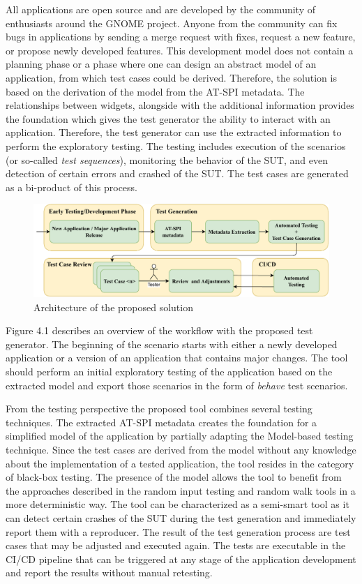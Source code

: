 All applications are open source and are developed by the community of enthusiasts around the GNOME project. Anyone from the community can fix bugs in applications by sending a merge request with fixes, request a new feature, or propose newly developed features. This development model does not contain a planning phase or a phase where one can design an abstract model of an application, from which test cases could be derived. Therefore, the solution is based on the derivation of the model from the AT-SPI metadata. The relationships between widgets, alongside with the additional information provides the foundation which gives the test generator the ability to interact with an application. Therefore, the test generator can use the extracted information to perform the exploratory testing. The testing includes execution of the scenarios (or so-called \textit{test sequences}), monitoring the behavior of the SUT, and even detection of certain errors and crashed of the SUT. The test cases are generated as a bi-product of this process.

\begin{figure}[hbt]
	\centering
	\includegraphics[width=1\textwidth]{obrazky-figures/overview.pdf}
	\caption{Architecture of the proposed solution}
	\label{Diagram}
\end{figure}

Figure 4.1 describes an overview of the workflow with the proposed test generator. The beginning of the scenario starts with either a newly developed application or a version of an application that contains major changes. The tool should perform an initial exploratory testing of the application based on the extracted model and export those scenarios in the form of \textit{behave} test scenarios.

From the testing perspective the proposed tool combines several testing techniques. The extracted AT-SPI metadata creates the foundation for a simplified model of the application by partially adapting the Model-based testing technique. Since the test cases are derived from the model without any knowledge about the implementation of a tested application, the tool resides in the category of black-box testing. The presence of the model allows the tool to benefit from the approaches described in the random input testing and random walk tools in a more deterministic way. The tool can be characterized as a semi-smart tool as it can detect certain crashes of the SUT during the test generation and immediately report them with a reproducer. The result of the test generation process are test cases that may be adjusted and executed again. The tests are executable in the CI/CD pipeline that can be triggered at any stage of the application development and report the results without manual retesting.


